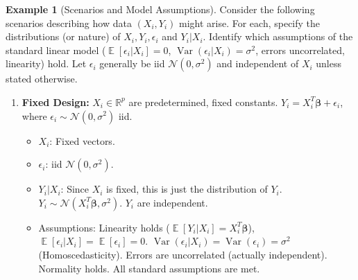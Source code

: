 \documentclass[11pt]{article}
\theoremstyle{definition}
\newtheorem{example}[theorem]{Example}
\theoremstyle{remark}
\DeclareMathOperator{\E}{\mathbb{E}}
\DeclareMathOperator{\Var}{\operatorname{Var}}
\begin{document}
\begin{example}[Scenarios and Model Assumptions] \label{ex:scenarios}
    Consider the following scenarios describing how data $(X_i, Y_i)$ might arise. For each, specify the distributions (or nature) of $X_i, Y_i, \epsilon_i$ and $Y_i | X_i$. Identify which assumptions of the standard linear model ($\E[\epsilon_i|X_i]=0$, $\Var(\epsilon_i|X_i)=\sigma^2$, errors uncorrelated, linearity) hold. Let $\epsilon_i$ generally be iid $\mathcal{N}(0, \sigma^2)$ and independent of $X_i$ unless stated otherwise.
    
    \begin{enumerate}
        \item \textbf{Fixed Design:} $X_i \in \mathbb{R}^p$ are predetermined, fixed constants. $Y_i = X_i^T \bm{\beta} + \epsilon_i$, where $\epsilon_i \sim \mathcal{N}(0, \sigma^2)$ iid.
            \begin{itemize}
                \item $X_i$: Fixed vectors.
                \item $\epsilon_i$: iid $\mathcal{N}(0, \sigma^2)$.
                \item $Y_i | X_i$: Since $X_i$ is fixed, this is just the distribution of $Y_i$. $Y_i \sim \mathcal{N}(X_i^T \bm{\beta}, \sigma^2)$. $Y_i$ are independent.
                \item Assumptions: Linearity holds ($\E[Y_i|X_i] = X_i^T\bm{\beta}$), $\E[\epsilon_i|X_i] = \E[\epsilon_i] = 0$. $\Var(\epsilon_i|X_i) = \Var(\epsilon_i) = \sigma^2$ (Homoscedasticity). Errors are uncorrelated (actually independent). Normality holds. All standard assumptions are met.
            \end{itemize}
            

\end{enumerate}
\end{example}
\end{document}
